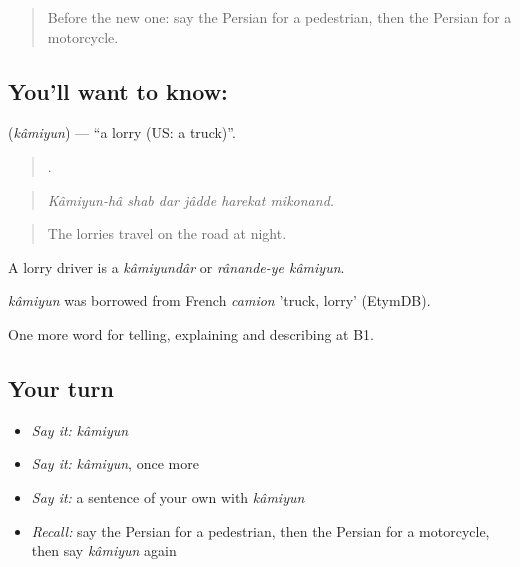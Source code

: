 \label{lesson:FA-C428-kamiyun}



\begin{quote}
Before the new one: say the Persian for a pedestrian, then the Persian for a motorcycle.
\end{quote}

\subsection*{You'll want to know: }
\textbf{} (\emph{kâmiyun}) — \textquotedblleft{}a lorry (US: a truck)\textquotedblright{}.

\begin{quote}
     .
\end{quote}

\begin{quote}
\emph{Kâmiyun-hâ shab dar jâdde harekat mikonand.}
\end{quote}

\begin{quote}
The lorries travel on the road at night.
\end{quote}

A lorry driver is a \emph{kâmiyundâr} or \emph{rânande-ye kâmiyun}.

\begin{cousinweb}
\emph{kâmiyun} was borrowed from French \emph{camion} 'truck, lorry' (EtymDB).
\end{cousinweb}

\begin{grammarlens}[title={What you've built}]
One more word for telling, explaining and describing at B1.
\end{grammarlens}

\subsection*{Your turn}
\begin{itemize}
\raggedright
  \item \emph{Say it:} \emph{kâmiyun}
  \item \emph{Say it:} \emph{kâmiyun}, once more
  \item \emph{Say it:} a sentence of your own with \emph{kâmiyun}
  \item \emph{Recall:} say the Persian for a pedestrian, then the Persian for a motorcycle, then say \emph{kâmiyun} again
\end{itemize}

